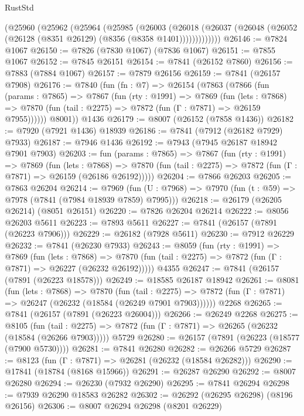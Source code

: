 \begin{lexlean}{RustStd}
\begin{coremodule}
{\begin{coremodule}
{{{{{{{{{{{{{{{{{{{{{{{{{{{{{{{{{{{{{{{{{{{{{{{{{{{{{{      (@25960
        (@25962
          (@25964
            (@25985
              (@26003
                (@26018
                  (@26037 (@26048 (@26052 (@26128 (@8351 @26129) (@8356 (@8358 @1401)))))))))))))
@26146 := @7824 @1067
@26150 := @7826 (@7830 @1067) (@7836 @1067)
@26151 := @7855 @1067
@26152 := @7845 @26151
@26154 := @7841 (@26152 @7860)
@26156 := @7883 (@7884 @1067)
@26157 := @7879 @26156
@26159 := @7841 (@26157 @7908)
@26176 := @7840
    (fun (fn : @7) =>
    @26154
      (@7863
        (@7866
          (fun (params : @7865) =>
          @7867
            (fun (rty : @1991) =>
            @7869
              (fun (lets : @7868) =>
              @7870 (fun (tail : @2275) => @7872 (fun (Γ : @7871) => @26159 @7955))))))
        @8001))
    @1436
@26179 := @8007 (@26152 (@7858 @1436))
@26182 := @7920 (@7921 @1436) @18939
@26186 := @7841 (@7912 (@26182 @7929) @7933)
@26187 := @7946 @1436
@26192 := @7943 (@7945 @26187 @18942 @7901 @7903)
@26203 := fun (params : @7865) =>
  @7867
    (fun (rty : @1991) =>
    @7869
      (fun (lets : @7868) =>
      @7870 (fun (tail : @2275) => @7872 (fun (Γ : @7871) => @26159 (@26186 @26192)))))
@26204 := @7866 @26203
@26205 := @7863 @26204
@26214 := @7969
    (fun (U : @7968) => @7970 (fun (t : @59) => @7978 (@7841 (@7984 @18939 @7859) @7995)))
@26218 := @26179 (@26205 @26214) (@8051 @26151)
@26220 := @7826 @26204 @26214
@26222 := @8056 @26203 @5611
@26223 := @7893 @5611
@26227 := @7841 (@26157 (@7891 (@26223 @7906)))
@26229 := @26182 (@7928 @5611)
@26230 := @7912 @26229
@26232 := @7841 (@26230 @7933)
@26243 := @8059
    (fun (rty : @1991) =>
    @7869
      (fun (lets : @7868) =>
      @7870 (fun (tail : @2275) => @7872 (fun (Γ : @7871) => @26227 (@26232 @26192)))))
    @4355
@26247 := @7841 (@26157 (@7891 (@26223 @18578)))
@26249 := @18585 @26187 @18942
@26261 := @8081
    (fun (lets : @7868) =>
    @7870
      (fun (tail : @2275) =>
      @7872 (fun (Γ : @7871) => @26247 (@26232 (@18584 (@26249 @7901 @7903))))))
    @2268
@26265 := @7841 (@26157 (@7891 (@26223 @26004)))
@26266 := @26249 @2268
@26275 := @8105
    (fun (tail : @2275) => @7872 (fun (Γ : @7871) => @26265 (@26232 (@18584 (@26266 @7903)))))
    @5729
@26280 := @26157 (@7891 (@26223 (@18577 (@7900 @5730))))
@26281 := @7841 @26280
@26282 := @26266 @5729
@26287 := @8123 (fun (Γ : @7871) => @26281 (@26232 (@18584 @26282)))
@26290 := @17841 (@18784 (@8168 @15966))
@26291 := @26287 @26290
@26292 := @8007 @26280
@26294 := @26230 (@7932 @26290)
@26295 := @7841 @26294
@26298 := @7939 @26290 @18583 @26282
@26302 := @26292 (@26295 @26298) (@8196 @26156)
@26306 := @8007 @26294 @26298 (@8201 @26229)
}}}}}}}}}}}}}}}}}}}}}}}}}}}}}}}}}}}}}}}}}}}}}}}}}}}}}}
\end{coremodule}}
\end{coremodule}
\end{lexlean}
